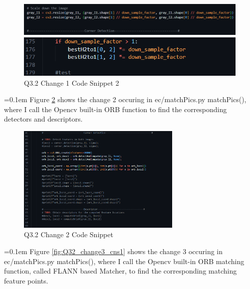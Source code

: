 \documentclass{article}
\begin{document}
	\begin{figure}[H]
	\centering
	\begin{minipage}[b]{0.45\textwidth}
		\centering
		\includegraphics[width=\textwidth]{./Q3_2_ar_ec_change1_cns1.png}  %
		\caption{Q3.2 Change 1 Code Snippet 1}
		\label{fig:Q32_change1_cns1}
	\end{minipage}
	\hfill  %
	\begin{minipage}[b]{0.45\textwidth}
		\centering
		\includegraphics[width=\textwidth]{./Q3_2_ar_ec_change1_cns2.png}  %
		\caption{Q3.2 Change 1 Code Snippet 2}
		\label{fig:Q32_change1_cns2}
	\end{minipage}
	\end{figure}
	\hangindent=0.1em \hspace{0.1em}Figure \ref{fig:Q32_change2_cns1} shows the change 2 occuring in ec/matchPics.py matchPics(), where I call the Opencv built-in ORB function to find the corresponding detectors and descriptors. 
		
	\begin{figure}[H]
		\centering
		\includegraphics[width=0.7\textwidth]{./Q3_2_ar_ec_change2_cns1.png}  %
		\caption{Q3.2 Change 2 Code Snippet}
		\label{fig:Q32_change2_cns1}
	\end{figure}
	\hangindent=0.1em \hspace{0.1em}Figure \ref{fig:Q32_change3_cns1} shows the change 3 occuring in ec/matchPics.py matchPics(), where I call the Opencv built-in ORB matching function, called FLANN based Matcher, to find the corresponding matching feature points.
	
\end{document}
